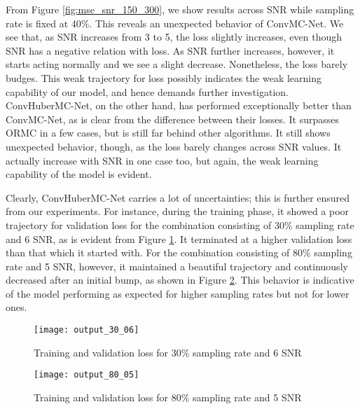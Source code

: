 From Figure \ref{fig:mse_snr_150_300}, we show results across SNR while sampling rate is fixed at 40\%. This reveals an unexpected behavior of ConvMC-Net. We see that, as SNR increases from 3 to 5, the loss slightly increases, even though SNR has a negative relation with loss. As SNR further increases, however, it starts acting normally and we see a slight decrease. Nonetheless, the loss barely budges. This weak trajectory for loss possibly indicates the weak learning capability of our model, and hence demands further investigation. ConvHuberMC-Net, on the other hand, has performed exceptionally better than ConvMC-Net, as is clear from the difference between their losses. It surpasses ORMC in a few cases, but is still far behind other algorithms. It still shows unexpected behavior, though, as the loss barely changes across SNR values. It actually increase with SNR in one case too, but again, the weak learning capability of the model is evident.

Clearly, ConvHuberMC-Net carries a lot of uncertainties; this is further ensured from our experiments. For instance, during the training phase, it showed a poor trajectory for validation loss for the combination consisting of 30\% sampling rate and 6 SNR, as is evident from Figure \ref{fig:output_30_06}. It terminated at a higher validation loss than that which it started with. For the combination consisting of 80\% sampling rate and 5 SNR, however, it maintained a beautiful trajectory and continuously decreased after an initial bump, as shown in Figure \ref{fig:output_80_05}. This behavior is indicative of the model performing as expected for higher sampling rates but not for lower ones.

\begin{figure}[htbp]
    \centering
    \texttt{[image: output\_30\_06]}
    \caption{Training and validation loss for 30\% sampling rate and 6 SNR}
    \label{fig:output_30_06}
\end{figure}

\begin{figure}[htbp]
    \centering
    \texttt{[image: output\_80\_05]}
    \caption{Training and validation loss for 80\% sampling rate and 5 SNR}
    \label{fig:output_80_05}
\end{figure}

